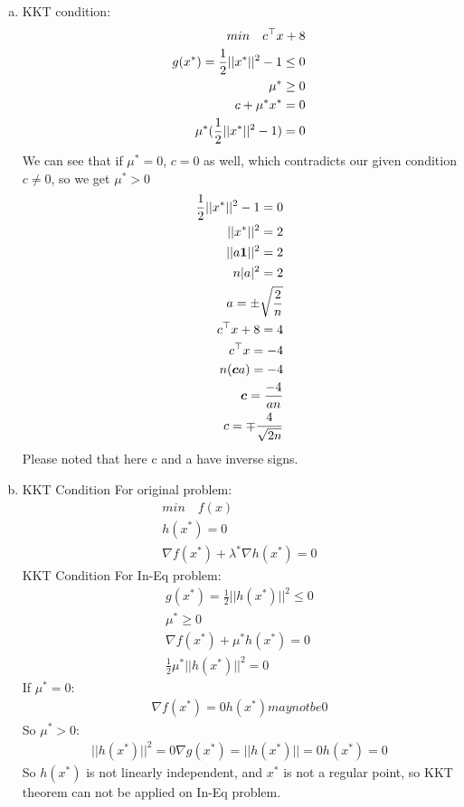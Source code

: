 \documentclass[12pt,twoside]{article}
\begin{document}
\begin{enumerate}[a)]
\item 
KKT condition:
\begin{align}
min \quad c^\top x + 8\\
g(x^*) = \frac{1}{2} ||x^*||^2 -1 \leq 0\\
\mu^* \geq 0\\
c + \mu^* x^* = 0\\
\mu^* (\frac{1}{2} ||x^*||^2 -1) = 0
\end{align}
We can see that if $\mu^* = 0$, $c=0$ as well, which contradicts our given condition $c \neq 0$, so we get $\mu^* > 0$
\begin{align}
\frac{1}{2} ||x^*||^2 -1 = 0\\
||x^*||^2 = 2\\
||a {\boldsymbol{{1}}}||^2 = 2\\
n|a|^2 = 2\\
a = \pm \sqrt{\frac{2}{n}}\\
c^\top x + 8 = 4\\
c^\top x = -4\\
n({\boldsymbol{{c}}} a) = -4\\
{\boldsymbol{{c}}} = \frac{-4}{an}\\
c = \mp \frac{4}{\sqrt{2n}}
\end{align}
Please noted that here c and a have inverse signs.

\item 
KKT Condition For original problem:
\begin{align}
min \quad f(x)\\
h(x^*) = 0\\
\nabla f(x^*) + \lambda^* \nabla h(x^*) = 0
\end{align}
KKT Condition For In-Eq problem:
\begin{align}
g(x^*) = \frac{1}{2}||h(x^*)||^2 \leq 0\\
\mu^* \geq 0\\
\nabla f(x^*) + \mu^* h(x^*) = 0\\
\frac{1}{2} \mu^* ||h(x^*)||^2 = 0
\end{align}
If $\mu^* = 0$:
\begin{align}
\nabla f(x^*) = 0
h(x^*) may not be 0
\end{align}
So $\mu^* > 0$:
\begin{align}
||h(x^*)||^2 = 0
\nabla g(x^*) = ||h(x^*)|| = 0
h(x^*) = 0
\end{align}
So $h(x^*)$ is not linearly independent, and $x^*$ is not a regular point, so KKT theorem can not be applied on In-Eq problem.


\end{enumerate}
\end{document}
